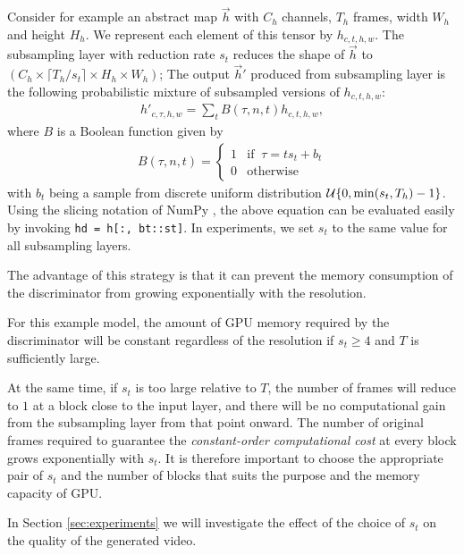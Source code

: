 \documentclass[twocolumn]{svjour3}
\def\Sec#1{Section \ref{sec:#1}}
\begin{document}
Consider for example an abstract map $\vec{h}$ with $C_h$ channels,
$T_h$ frames, width $W_h$ and height $H_h$.
We represent each element of this tensor by $h_{c,t,h,w}$.
The subsampling layer with reduction rate $s_t$ reduces the shape of $\vec{h}$ to
$(C_h \times \lceil T_h / s_t \rceil \times H_h \times W_h)$; The output $\vec{h}'$ produced from subsampling layer is the following probabilistic mixture of subsampled versions of $h_{c,t,h,w}$:
\begin{align}
\label{eqn:subsampling}
    h'_{c, \tau, h, w} = \sum_{t} B(\tau, n, t) h_{c, t, h, w},
\end{align}
where $B$ is a Boolean function given by
\begin{align}
\label{eqn:subsampling2}
  B(\tau, n, t) = \begin{cases}
    1 & \mathrm{if}\;\;\tau = t s_t + b_t\\
    0 & \mathrm{otherwise}
  \end{cases}
\end{align}
with $b_t$ being a sample from discrete uniform distribution  ${\cal U}\{0, \min(s_t, T_h) - 1\}$.
Using the slicing notation of NumPy \cite{Oliphant2015}, the above equation can be evaluated easily by invoking \texttt{hd = h[:, bt::st]}.
In experiments, we set $s_t$ to the same value for all subsampling layers.







The advantage of this strategy is that it can prevent the memory consumption of the discriminator from growing exponentially with the resolution.


For this example model, the amount of GPU memory required by the discriminator will be constant regardless of the resolution if $s_t \geq 4$ and $T$ is sufficiently large.

At the same time, if $s_t$ is too large relative to $T$, the number of frames will reduce to $1$ at a block close to the input layer, and there will be no computational gain from the subsampling layer from that point onward.
The number of original frames required to guarantee the \textit{constant-order computational cost} at every block grows exponentially with $s_t$.
It is therefore important to choose the appropriate pair of $s_t$ and the number of blocks that suits the purpose and the memory capacity of GPU.

In \Sec{experiments} we will investigate the effect of the choice of $s_t$ on the quality of the generated video.
\end{document}
